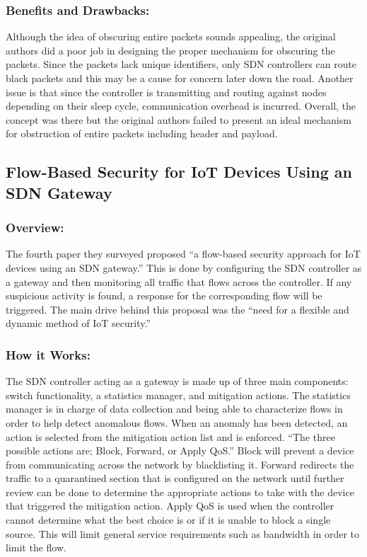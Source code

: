 \subsubsection {Benefits and Drawbacks:}
\smallskip

Although the idea of obscuring entire packets sounds appealing, the original authors did a poor job in designing the proper mechanism for obscuring the packets. Since the packets lack unique identifiers, only SDN controllers can route black packets and this may be a cause for concern later down the road. Another issue is that since the controller is transmitting and routing against nodes depending on their sleep cycle, communication overhead is incurred. Overall, the concept was there but the original authors failed to present an ideal mechanism for obstruction of entire packets including header and payload. 

\subsection {Flow-Based Security for IoT Devices Using an SDN Gateway}
\subsubsection {Overview:}
\smallskip

The fourth paper they surveyed proposed “a flow-based security approach for IoT devices using an SDN gateway.” \cite {kalkan2017securing} This is done by configuring the SDN controller as a gateway and then monitoring all traffic that flows across the controller. If any suspicious activity is found, a response for the corresponding flow will be triggered. The main drive behind this proposal was the “need for a flexible and dynamic method of IoT security.” \cite {bull2016flow}

\subsubsection {How it Works:}
\smallskip

The SDN controller acting as a gateway is made up of three main components: switch functionality, a statistics manager, and mitigation actions. The statistics manager is in charge of data collection and being able to characterize flows in order to help detect anomalous flows. When an anomaly has been detected, an action is selected from the mitigation action list and is enforced. “The three possible actions are; Block, Forward, or Apply QoS.” \cite {bull2016flow} Block will prevent a device from communicating across the network by blacklisting it. Forward redirects the traffic to a quarantined section that is configured on the network until further review can be done to determine the appropriate actions to take with the device that triggered the mitigation action. Apply QoS is used when the controller cannot determine what the best choice is or if it is unable to block a single source. This will limit general service requirements such as bandwidth in order to limit the flow.

